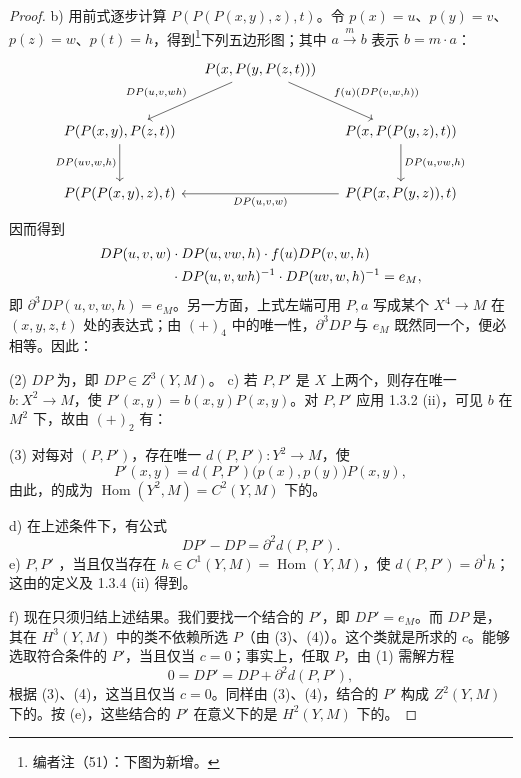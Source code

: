 \begin{proof}
 b) 用前式逐步计算 $P(P(P(x,y),z),t)$。令 $p(x)=u$、$p(y)=v$、$p(z)=w$、$p(t)=h$，得到\footnote{编者注（51）：下图为新增。}下列五边形图；其中 $a\xrightarrow{m}b$ 表示 $b=m\cdot a$：
\[
\begin{tikzcd}[column sep=small,row sep=large]
 &P(x,P(y,P(z,t)))\arrow[dl,"{DP(u,v,wh)}"']\arrow[dr,"{f(u)(DP(v,w,h))}"]&\\
 P(P(x,y),P(z,t))\arrow[d,"{DP(uv,w,h)}"']&&P(x,P(P(y,z),t))\arrow[d,"{DP(u,vw,h)}"]\\
 P(P(P(x,y),z),t)&&P(P(x,P(y,z)),t)\arrow[ll,"{DP(u,v,w)}"]
\end{tikzcd}
\]
因而得到
\[
\begin{aligned}
 {}&DP(u,v,w)\cdot DP(u,vw,h)\cdot f(u)DP(v,w,h)\\
 &\hspace{18mm}\cdot DP(u,v,wh)^{-1}\cdot DP(uv,w,h)^{-1}=e_M,
\end{aligned}
\]
即 $\partial^3DP(u,v,w,h)=e_M$。另一方面，上式左端可用 $P,a$ 写成某个 $X^4\to M$ 在 $(x,y,z,t)$ 处的表达式；由 $(+)_4$ 中的唯一性，$\partial^3DP$ 与 $e_M$ 既然同一个，便必相等。因此：

(2) $DP$ 为，即 $DP\in Z^3(Y,M)$。
 c) 若 $P,P'$ 是 $X$ 上两个，则存在唯一 $b:X^2\to M$，使 $P'(x,y)=b(x,y)P(x,y)$。对 $P,P'$ 应用 1.3.2 (ii)，可见 $b$ 在 $M^2$ 下，故由 $(+)_2$ 有：

(3) 对每对 $(P,P')$，存在唯一 $d(P,P'):Y^2\to M$，使
\[
 P'(x,y)=d(P,P')\bigl(p(x),p(y)\bigr)P(x,y),
\]
由此，的成为 $\operatorname{Hom}(Y^2,M)=C^2(Y,M)$ 下的。

 d) 在上述条件下，有公式
\[
 DP'-DP=\partial^2d(P,P'). \tag{4}
\]
 e) $P,P'$ ，当且仅当存在 $h\in C^1(Y,M)=\operatorname{Hom}(Y,M)$，使 $d(P,P')=\partial^1h$；这由的定义及 1.3.4 (ii) 得到。

 f) 现在只须归结上述结果。我们要找一个结合的 $P'$，即 $DP'=e_M$。而 $DP$ 是，其在 $H^3(Y,M)$ 中的类不依赖所选 $P$（由 (3)、(4)）。这个类就是所求的 $c$。能够选取符合条件的 $P'$，当且仅当 $c=0$；事实上，任取 $P$，由 (1) 需解方程
\[
 0=DP'=DP+\partial^2d(P,P'),
\]
根据 (3)、(4)，这当且仅当 $c=0$。同样由 (3)、(4)，结合的 $P'$ 构成 $Z^2(Y,M)$ 下的。按 (e)，这些结合的 $P'$ 在意义下的是 $H^2(Y,M)$ 下的。
\end{proof}
